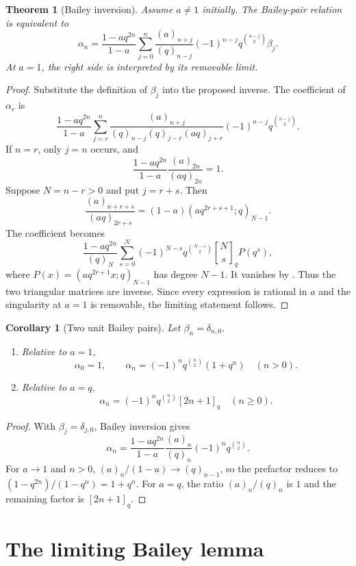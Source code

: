 \documentclass[11pt,oneside,openany]{book}
\newtheorem{theorem}{Theorem}[chapter]
\newtheorem{corollary}[corollary]{Corollary}
\theoremstyle{definition}
\theoremstyle{remark}
\newcommand{\qbinom}[2]{\genfrac{[}{]}{0pt}{}{#1}{#2}_{q}}
\begin{document}
\begin{theorem}[Bailey inversion]\label{thm:bailey-inversion}
Assume $a\ne1$ initially.  The Bailey-pair relation is equivalent to
\[
 \alpha_n=\frac{1-aq^{2n}}{1-a}
 \sum_{j=0}^{n}
 \frac{(a)_{n+j}}{(q)_{n-j}}
 (-1)^{n-j}q^{\binom{n-j}{2}}\beta_j.
\]
At $a=1$, the right side is interpreted by its removable limit.
\end{theorem}

\begin{proof}
Substitute the definition of $\beta_j$ into the proposed inverse.  The coefficient of $\alpha_r$ is
\[
 \frac{1-aq^{2n}}{1-a}
 \sum_{j=r}^{n}
 \frac{(a)_{n+j}}{(q)_{n-j}(q)_{j-r}(aq)_{j+r}}
 (-1)^{n-j}q^{\binom{n-j}{2}}.
\]
If $n=r$, only $j=n$ occurs, and
\[
 \frac{1-aq^{2n}}{1-a}\frac{(a)_{2n}}{(aq)_{2n}}=1.
\]
Suppose $N=n-r>0$ and put $j=r+s$.  Then
\[
 \frac{(a)_{n+r+s}}{(aq)_{2r+s}}
 =(1-a)(aq^{2r+s+1};q)_{N-1}.
\]
The coefficient becomes
\[
 \frac{1-aq^{2n}}{(q)_N}
 \sum_{s=0}^{N}(-1)^{N-s}q^{\binom{N-s}{2}}
 \qbinom Ns P(q^s),
\]
where
\(
 P(x)=(aq^{2r+1}x;q)_{N-1}
\)
has degree $N-1$.  It vanishes by .  Thus the two triangular matrices are inverse.  Since every expression is rational in $a$ and the singularity at $a=1$ is removable, the limiting statement follows.
\end{proof}

\begin{corollary}[Two unit Bailey pairs]\label{cor:unit-bailey-pairs}
Let $\beta_n=\delta_{n,0}$.
\begin{enumerate}[label=\textup{(\roman*)}]
\item Relative to $a=1$,
\[
 \alpha_0=1,
 \qquad
 \alpha_n=(-1)^nq^{\binom n2}(1+q^n)\quad(n>0).
\]
\item Relative to $a=q$,
\[
 \alpha_n=(-1)^nq^{\binom n2}[2n+1]_q\quad(n\ge0).
\]
\end{enumerate}
\end{corollary}

\begin{proof}
With $\beta_j=\delta_{j,0}$, Bailey inversion gives
\[
 \alpha_n=\frac{1-aq^{2n}}{1-a}
 \frac{(a)_n}{(q)_n}(-1)^nq^{\binom n2}.
\]
For $a\to1$ and $n>0$, $(a)_n/(1-a)\to(q)_{n-1}$, so the prefactor reduces to
\(
 (1-q^{2n})/(1-q^n)=1+q^n.
\)
For $a=q$, the ratio $(a)_n/(q)_n$ is $1$ and the remaining factor is $[2n+1]_q$.
\end{proof}

\section{The limiting Bailey lemma}
\end{document}
